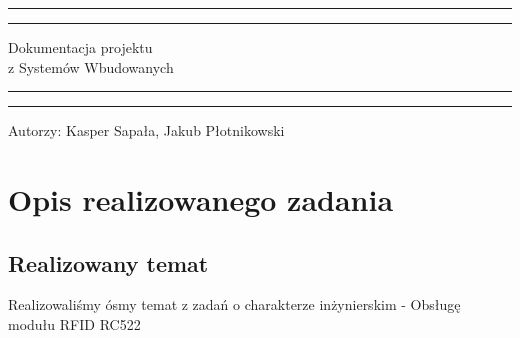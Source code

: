 \documentclass[12pt,hidelinks]{article}
\begin{document}
    \begin{titlepage}
        \centering %
        \scshape %
        \vspace*{1.5\baselineskip} %

        \rule{13cm}{1.6pt}\vspace*{-\baselineskip}\vspace*{2pt} %
        \rule{13cm}{0.4pt} %

        \vspace{0.75\baselineskip} %
        {    \Huge Dokumentacja projektu\\
        \vspace{4mm}
        z Systemów Wbudowanych \\
        }
        \vspace{0.75\baselineskip} %
        \rule{13cm}{0.4pt}\vspace*{-\baselineskip}\vspace{3.2pt} %
        \rule{13cm}{1.6pt} %

        \vspace{1.75\baselineskip} %
        {\large Autorzy: Kasper Sapała, Jakub Płotnikowski \\
        }
        \vfill
    \end{titlepage}
    \tableofcontents
    \vfill
    \newpage
    \section{Opis realizowanego zadania}
    \vspace{10.5cm}
    \subsection{Realizowany temat}
    Realizowaliśmy ósmy temat z zadań o charakterze inżynierskim - Obsługę modułu RFID RC522
\end{document}
